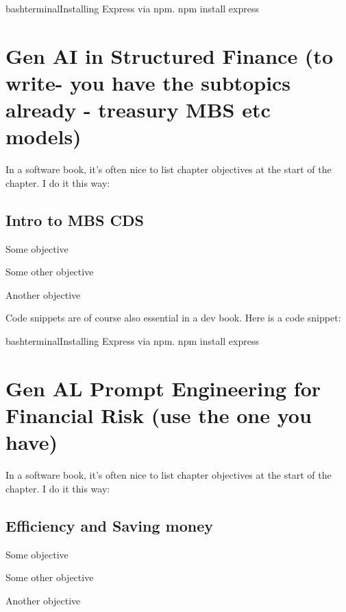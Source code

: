 \documentclass[a4paper,headinclude=on,footinclude=on,12pt,oneside]{scrbook}
\begin{document}
\begin{codeInput}{bash}{terminal}{Installing Express via npm.}
	npm install express
\end{codeInput}




\chapter{Gen AI in Structured Finance (to write- you have the subtopics already - treasury MBS etc models)}
In a software book, it's often nice to list chapter objectives at the start of the chapter. I do it this way:
\section{Intro to MBS CDS}
\begin{arrows}
	\item Some objective
	\item Some other objective
	\item Another objective
\end{arrows}


Code snippets are of course also essential in a dev book. Here is a code snippet:

\begin{codeInput}{bash}{terminal}{Installing Express via npm.}
	npm install express
\end{codeInput}




\chapter{Gen AL Prompt Engineering for Financial Risk (use the one you have)}
In a software book, it's often nice to list chapter objectives at the start of the chapter. I do it this way:
\section{Efficiency and Saving money}
\begin{arrows}
	\item Some objective
	\item Some other objective
	\item Another objective
\end{arrows}

\end{document}
